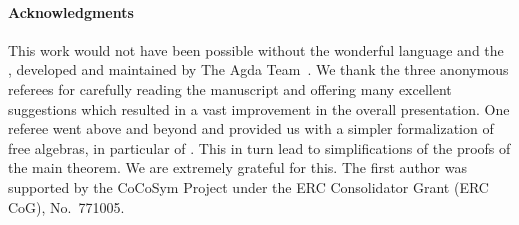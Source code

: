 \paragraph*{Acknowledgments}
This work would not have been possible without the wonderful \agda language and
the \agdastdlib, developed and maintained by The Agda Team~\cite{agdastdlib}.
We thank the three anonymous referees for carefully reading the manuscript and
offering many excellent suggestions which resulted in a vast improvement in the
overall presentation.  One referee went above and beyond and provided us with a
simpler formalization of free algebras, in particular of .
This in turn lead to simplifications of the proofs of the main theorem. We are
extremely grateful for this.
The first author was supported by the CoCoSym Project
under the ERC Consolidator Grant (ERC CoG), No.~771005.




